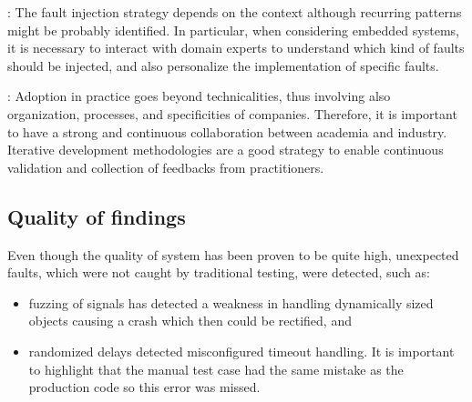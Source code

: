 : The fault injection strategy depends on the context although recurring patterns might be probably identified.  In particular, when considering embedded systems, it is necessary to interact with domain experts to understand which kind of faults should be injected, and also personalize the implementation of specific faults.

: Adoption in practice goes beyond technicalities, thus involving also organization, processes, and specificities of companies. Therefore, it is important to have a strong and continuous collaboration between academia and industry. Iterative development methodologies are a good strategy to enable continuous validation and collection of feedbacks from practitioners. %



\subsection{Quality of findings}\label{sec:qualityOfFindings}


Even though the quality of system has been proven to be quite high, unexpected faults, which were not caught by traditional testing, were detected, such as: 

\begin{itemize}
\item fuzzing of signals has detected a weakness in handling dynamically sized objects causing a crash which then could be rectified, and 
\item randomized delays detected misconfigured timeout handling. It is important to highlight that the manual test case had the same mistake as the production code so this error was missed.
\end{itemize}

